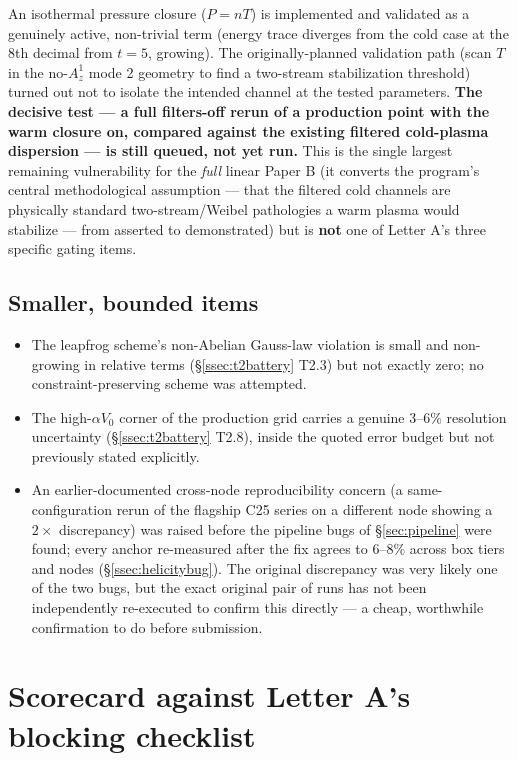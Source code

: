 \documentclass[11pt,a4paper]{article}
\numberwithin{equation}{section}
\theoremstyle{remark}
\newcommand{\Vo}{V_0}
\begin{document}
An isothermal pressure closure ($P=nT$) is implemented and validated as a
genuinely active, non-trivial term (energy trace diverges from the cold
case at the 8th decimal from $t=5$, growing). The originally-planned
validation path (scan $T$ in the no-$A_z^1$ mode 2 geometry to find a
two-stream stabilization threshold) turned out not to isolate the
intended channel at the tested parameters. \textbf{The decisive test ---
a full filters-off rerun of a production point with the warm closure on,
compared against the existing filtered cold-plasma dispersion --- is
still queued, not yet run.} This is the single largest remaining
vulnerability for the \emph{full} linear Paper B (it converts the
program's central methodological assumption --- that the filtered cold
channels are physically standard two-stream/Weibel pathologies a warm
plasma would stabilize --- from asserted to demonstrated) but is
\textbf{not} one of Letter A's three specific gating items.

\subsection{Smaller, bounded items}

\begin{itemize}
\item The leapfrog scheme's non-Abelian Gauss-law violation is small and
non-growing in relative terms (\S\ref{ssec:t2battery} T2.3) but not
exactly zero; no constraint-preserving scheme was attempted.
\item The high-$\alpha\Vo$ corner of the production grid carries a
genuine 3--6\% resolution uncertainty (\S\ref{ssec:t2battery} T2.8),
inside the quoted error budget but not previously stated explicitly.
\item An earlier-documented cross-node reproducibility concern (a
same-configuration rerun of the flagship C25 series on a different node
showing a $2\times$ discrepancy) was raised before the pipeline bugs of
\S\ref{sec:pipeline} were found; every anchor re-measured after the fix
agrees to $6$--$8\%$ across box tiers and nodes (\S\ref{ssec:helicitybug}).
The original discrepancy was very likely one of the two bugs, but the
exact original pair of runs has not been independently re-executed to
confirm this directly --- a cheap, worthwhile confirmation to do before
submission.
\end{itemize}

\section{Scorecard against Letter A's blocking checklist}
\label{sec:scorecard}
\end{document}
